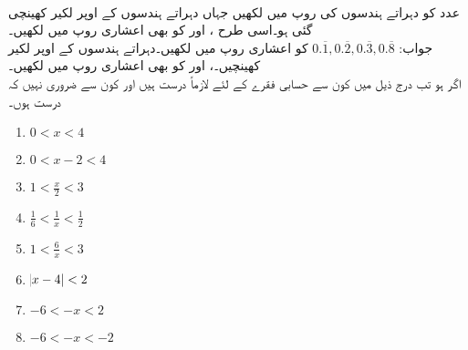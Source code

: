 \\
عدد  کو دہراتے ہندسوں کی روپ میں لکھیں جہاں دہراتے ہندسوں کے اوپر لکیر کھینچی گئی ہو۔اسی طرح ،  اور  کو بھی اعشاری روپ میں لکھیں۔\\
جواب:\quad
$0.\overline{1}, 0.\overline{2},0.\overline{3},0.\overline{8}$
 کو اعشاری روپ میں لکھیں۔دہراتے ہندسوں کے اوپر لکیر کھینچیں۔،  اور  کو بھی اعشاری روپ میں لکھیں۔
\\
اگر  ہو تب درج ذیل میں کون سے حسابی فقرے  کے لئے لازماً درست ہیں اور کون سے ضروری نہیں کہ درست ہوں۔
\begin{multicols}{3}
\begin{enumerate}[a]
\item
$0<x<4 $
\item
$0<x-2<4$
\item
$1<\tfrac{x}{2}<3$
\item
$\tfrac{1}{6}<\tfrac{1}{x}<\tfrac{1}{2}$
\item
$1<\tfrac{6}{x}<3$
\item
$\abs{x-4}<2$
\item
$-6<-x<2$
\item
$ -6<-x<-2$
\end{enumerate}
\end{multicols}

